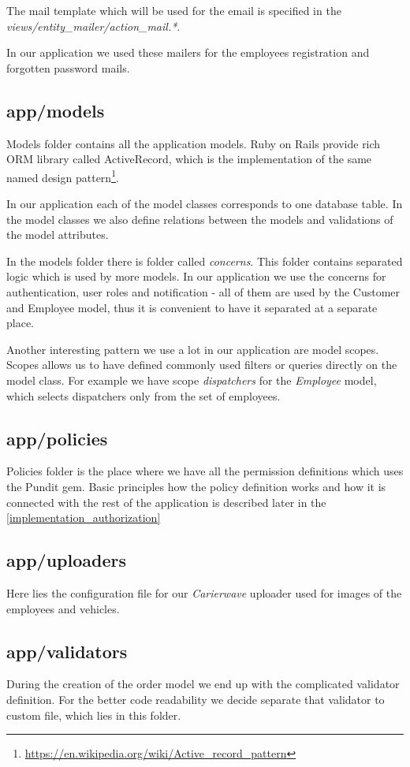 		 The mail template which will be used for the email is specified in the \textit{views/entity\_mailer/action\_mail.*}.
		 
		 In our application we used these mailers for the employees registration and forgotten password mails.
	\subsection{app/models}
		Models folder contains all the application models. Ruby on Rails provide rich ORM library called ActiveRecord, which is the implementation of the same named design pattern\footnote{\url{https://en.wikipedia.org/wiki/Active\_record\_pattern}}.
		
		In our application each of the model classes corresponds to one database table. In the model classes we also define relations between the models and validations of the model attributes. 
		
		In the models folder there is folder called \textit{concerns}. This folder contains separated logic which is used by more models. In our application we use the concerns for authentication, user roles and notification - all of them are used by the Customer and Employee model, thus it is convenient to have it separated at a separate place.
		
		Another interesting pattern we use a lot in our application are model scopes. Scopes allows us to have defined commonly used filters or queries directly on the model class. For example we have scope \textit{dispatchers} for the \textit{Employee} model, which selects dispatchers only from the set of employees.
		
	\subsection{app/policies}
		Policies folder is the place where we have all the permission definitions which uses the Pundit gem. Basic principles how the policy definition works and how it is connected with the rest of the application is described later in the \ref{implementation_authorization} 
	\subsection{app/uploaders}
		Here lies the configuration file for our \textit{Carierwave} uploader used for images of the employees and vehicles. 
	\subsection{app/validators}
		During the creation of the order model we end up with the complicated validator definition. For the better code readability we decide separate that validator to custom file, which lies in this folder. 
		
